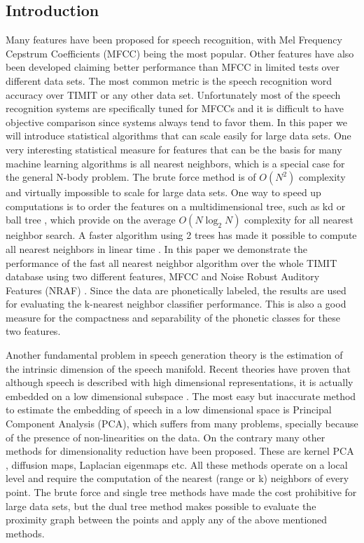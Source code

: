 \documentclass[12pt,letterpaper,doublespaced,ETD,dvips,proposal]{gtthesis}
\begin{document}
\begin{Body}
\subsection{Introduction} Many features have been proposed for speech
recognition, with Mel Frequency Cepstrum Coefficients (MFCC)
\cite{quatieri2002dts} being the most popular. Other features have
also been developed claiming better performance than MFCC in limited
tests over different data sets. The most common metric is the speech
recognition word accuracy over TIMIT or any other data set.
Unfortunately most of the speech recognition systems are
specifically tuned for MFCCs and it is difficult to have objective
comparison since systems always tend to favor them. In this paper we
will introduce statistical algorithms that can scale easily for
large data sets. One very interesting statistical measure for
features that can be the basis for many machine learning algorithms
is all nearest neighbors, which is a special case for the general
N-body problem. The brute force method is of $O(N^2)$  complexity
and virtually impossible to scale for large data sets. One way to
speed up computations is to order the features on a multidimensional
tree, such as kd or ball tree \cite{bentley1975bst},
\cite{moore2000ahu} which provide on the average $O(N\log_2N)$
complexity for all nearest neighbor search. A faster algorithm using
2 trees has made it possible to compute all nearest neighbors in
linear time \cite{gray2000nbp}.  In this paper we demonstrate the
performance of the fast all nearest neighbor algorithm over the
whole TIMIT database using two different features, MFCC and Noise
Robust Auditory Features (NRAF) \cite{ravindran:inr}. Since the data
are phonetically labeled, the results are used for evaluating the
k-nearest neighbor classifier performance. This is also a good
measure for the compactness and separability of the phonetic classes
for these two features.

Another fundamental problem in speech generation theory is the
estimation of the intrinsic dimension of the speech manifold. Recent
theories have proven that although speech is described with high
dimensional representations, it is actually embedded on a low
dimensional subspace \cite{jansen2006ifa}. The most easy but
inaccurate method to estimate the embedding of speech in a low
dimensional space is Principal Component Analysis (PCA), which
suffers from many problems, specially because of the presence of
non-linearities on the data. On the contrary many other methods for
dimensionality reduction have been proposed. These are kernel PCA
\cite{scholkopf:nca}, diffusion maps, Laplacian eigenmaps
\cite{coifman2006dm} etc. All these methods operate on a local level
and require the computation of the nearest (range or k) neighbors of
every point. The brute force and single tree methods have made the
cost prohibitive for large data sets, but the dual tree method makes
possible to evaluate the proximity graph between the points and
apply any of the above mentioned methods.


\end{Body}
\end{document}
